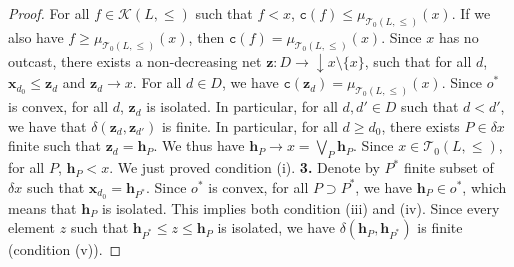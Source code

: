 \documentclass{article}
\begin{document}
\begin{proof}
For all $f \in \mathcal{K}(L,\le)$ such that $f < x$, $\texttt{c}(f) \le \mu_{\mathcal{T}_0(L,\le)}(x)$.
If we also have $f \ge \mu_{\mathcal{T}_0(L,\le)}(x)$, 
then $\texttt{c}(f) = \mu_{\mathcal{T}_0(L,\le)}(x)$.
Since $x$ has no outcast, there exists 
a non-decreasing net $\boldsymbol{z} : D \rightarrow \mathop{\downarrow}x\setminus \{x\}$, such that for all $d$, $\boldsymbol{x}_{d_0} \le \boldsymbol{z}_{d}$ and $\boldsymbol{z}_{d} \rightarrow x$. For all $d \in D$, we have $\texttt{c}(\boldsymbol{z}_d) = \mu_{\mathcal{T}_0(L,\le)}(x)$. 
Since $o^*$ is convex, for all $d$, $\boldsymbol{z}_d$ is isolated. In particular, for all $d,d' \in D$ such that $d < d'$, we have that $\delta(\boldsymbol{z}_d,\boldsymbol{z}_{d'})$ is finite. 
In particular, for all $d \ge d_0$, there exists $P \in \delta x$ finite such that $\boldsymbol{z}_d = \boldsymbol{h}_P$. We thus have $\boldsymbol{h}_P \rightarrow x = \bigvee_{P} \boldsymbol{h}_P$. Since $x \in \mathcal{T}_0(L,\le)$, for all $P$, $\boldsymbol{h}_P < x$. We just proved condition (i).
\textbf{3.} Denote by $P^*$ finite subset of $\delta x$
such that $\boldsymbol{x}_{d_0} = \boldsymbol{h}_{P^*}$.
Since $o^*$ is convex, for all $P \supset P^*$, 
we have $\boldsymbol{h}_P \in o^*$, which means 
that $\boldsymbol{h}_P$ is isolated. This implies both condition (iii) and (iv). Since every element $z$
such that $\boldsymbol{h}_{P^*} \le z \le \boldsymbol{h}_P$ is isolated, we have $\delta(\boldsymbol{h}_P,\boldsymbol{h}_{P^*})$ is finite (condition (v)). 


\end{proof}
\end{document}
